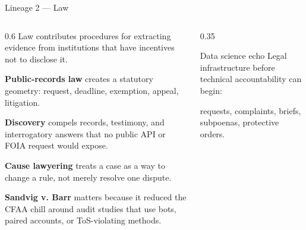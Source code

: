 \documentclass[9pt,aspectratio=169]{beamer}
\begin{document}
\begin{frame}{Lineage 2 --- Law}
    \begin{columns}[T]
        \begin{column}{0.6\textwidth}
            Law contributes procedures for extracting evidence from institutions that have incentives not to disclose it.

            \medskip

            \textbf{Public-records law} creates a statutory geometry: request, deadline, exemption, appeal, litigation.

            \medskip

            \textbf{Discovery} compels records, testimony, and interrogatory answers that no public API or FOIA request would expose.

            \medskip

            \textbf{Cause lawyering} treats a case as a way to change a rule, not merely resolve one dispute.

            \medskip

            \textbf{Sandvig v. Barr} matters because it reduced the CFAA chill around audit studies that
            use bots, paired accounts, or ToS-violating methods.
        \end{column}
        \begin{column}{0.35\textwidth}
            \begin{alertblock}{Data science echo}
                \small
                Legal infrastructure before technical accountability can begin:

                \medskip

                requests, complaints, briefs, subpoenas, protective orders.
            \end{alertblock}
        \end{column}
    \end{columns}
\end{frame}
\end{document}
